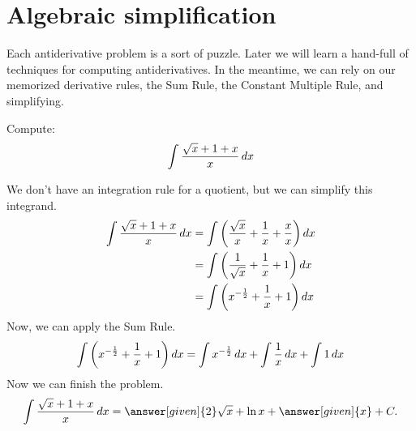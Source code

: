 \documentclass{ximera}
\begin{document}
\section{Algebraic simplification}


Each antiderivative problem is a sort of puzzle. Later we will learn a
hand-full of techniques for computing antiderivatives. In the meantime, we can rely on our memorized derivative rules, the Sum Rule, the Constant Multiple Rule, and simplifying.


%



\begin{example}
Compute:
\[
\int \frac{\sqrt{x}+1+x}{x} \mathop{}\!d x
\]
\begin{explanation}
We don't have an integration rule for a quotient, but we can simplify this integrand. 
\begin{align*}
  \int \frac{\sqrt{x}+1+x}{x} \mathop{}\!d x &=\int \left(\frac{\sqrt{x}}{x}+\frac{1}{x}+\frac{x}{x}\right) \mathop{}\!d x\\
  &=\int \left(\frac{1}{\sqrt{x}}+\frac{1}{x}+1\right) \mathop{}\!d x\\
  &=\int \left(x^{-\frac{1}{2}}+\frac{1}{x}+1\right) \mathop{}\!d x
\end{align*}
Now, we can apply the Sum Rule.
\[
\int \left(x^{-\frac{1}{2}}+\frac{1}{x}+1\right) \mathop{}\!d x=\int x^{-\frac{1}{2}}\mathop{}\!d x+\int\frac{1}{x}\mathop{}\!d x+\int1 \mathop{}\!d x
\]
Now we can finish the problem.
\[
\int \frac{\sqrt{x}+1+x}{x} \d x= \answer[given]{2}\sqrt{x}+\ln{x}+ \answer[given]{x} + C.
\]
\end{explanation}
\end{example}
\end{document}
